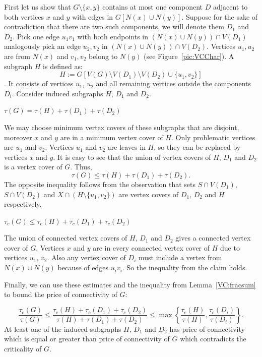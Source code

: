 \begin{myproof}
	First let us show that \(G \setminus \{x, y\}\) contains at most one component \(D\) adjacent to both vertices \(x\) and \(y\)
	with edges in \(G[N(x) \cup N(y)]\).
	Suppose for the sake of contradiction that there are two such components, we will denote them \(D_1\) and \(D_2\).
	Pick one edge \(u_1v_1\) with both endpoints in \((N(x) \cup N(y)) \cap V(D_1)\) analogously pick an edge \(u_2, v_2\) in \((N(x) \cup N(y)) \cap V(D_2)\).
	Vertices \(u_1, u_2\) are from \(N(x)\) and \(v_1, v_2\) belong to \(N(y)\) (see Figure~\ref{pic:VCChar}). 
	A subgraph \(H\) is defined as: \[H:= G[V(G) \setminus V(D_1) \setminus V(D_2) \cup \{u_1, v_2\}]\]. 
	It consists of vertices \(u_1\), \(u_2\) and all remaining vertices outside the components \(D_i\).
	Consider induced subgraphs \(H\), \(D_1\) and \(D_2\). 
	\begin{claim}
		\(\tau(G) = \tau(H) + \tau(D_1) + \tau(D_2)\)
	\end{claim}
	We may choose minimum vertex covers of these subgraphs that are disjoint, moreover \(x\) and \(y\) are in a minimum vertex cover of \(H\). %
	Only problematic vertices are \(u_1\) and \(v_2\).
	Vertices \(u_1\) and \(v_2\) are leaves in \(H\), so they can be replaced by vertices \(x\) and \(y\).
	It is easy to see that the union of vertex covers of \(H\), \(D_1\) and \(D_2\) is a vertex cover of \(G\). 
	Thus, \[\tau(G) \leq \tau(H) + \tau(D_1) + \tau(D_2).\]
	The opposite inequality follows from the observation that sets \(S \cap V(D_1)\), \(S \cap V(D_2)\) and \(X \cap (H \setminus\{u_1, v_2\})\) 
	are vertex covers of \(D_1\), \(D_2\) and \(H\) respectively.
	
	\begin{claim}
		\(\tau_c(G) \leq \tau_c(H) + \tau_c(D_1) + \tau_c(D_2)\)
	\end{claim}
	The union of connected vertex covers of \(H\), \(D_1\) and \(D_2\) gives a connected vertex cover of \(G\). 
	Vertices \(x\) and \(y\) are in every connected vertex cover of \(H\) due to vertices \(u_1\), \(v_2\).
	Also any vertex cover of \(D_i\) must include a vertex from \(N(x) \cup N(y)\) because of edges \(u_iv_i\).
	So the inequality from the claim holds.
	
	Finally, we can use these estimates and the inequality from Lemma~\ref{VC:fracsum} to bound the price of connectivity of \(G\):
	
	\[\frac{\tau_c(G)}{\tau(G)} \leq {\frac{\tau_c(H) + \tau_c(D_1) + \tau_c(D_2)}{\tau(H) + \tau(D_1) + \tau(D_2)}} 
	\leq \max\left\{ \frac{\tau_c(H)}{\tau(H)}, \frac{\tau_c(D_i)}{\tau(D_i)}\right\}.\]
	At least one of the induced subgraphs \(H\), \(D_1\) and \(D_2\) has price of connectivity which is equal or greater than price of connectivity of \(G\)
	which contradicts the criticality of \(G\).


\end{myproof}
